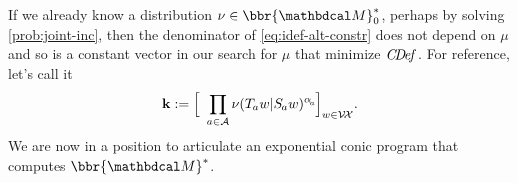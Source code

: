 \documentclass[twoside]{article}
\begin{document}
If we already know a distribution $\nu \in \bbr{\dg M}_0^*$,
perhaps by solving \eqref{prob:joint-inc}, then
the denominator of \eqref{eq:idef-alt-constr} does not depend on $\mu$ and so is a constant vector in our search for $\mu$ that minimize $\mathit{C\mskip-3.5muD\mskip-2.5mue\mskip-1.5muf}_{}$.
For reference, let's call it
\begin{equation}
    \mat k :=
        \Big[
        ~\prod_{a \in \Ar} \nu(\Tgt a w | \Src a w)^{\alpha\ssub a}
        \Big]%
        _{w \in \V\!\X}.
        \label{eq:cm-product}
\end{equation}
%
%
%
We are now in a position to articulate an exponential conic program
that computes $\bbr{\dg M}^*$.
\end{document}
